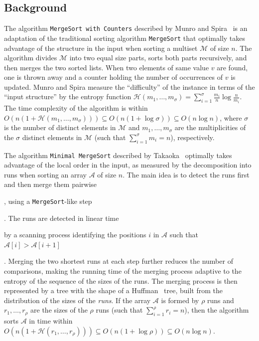\subsection{Background}
\label{sec:back}

The algorithm \texttt{MergeSort with Counters} described by Munro and
Spira~\cite{1976-JComp-SortingAndSearchingInMultisets-MunroSpira} is
an adaptation of the traditional sorting algorithm \texttt{MergeSort}
that optimally takes advantage of the structure in the input when
sorting a multiset $\mathcal{M}$ of size $n$. The algorithm divides
$\mathcal{M}$ into two equal size parts, sorts both parts recursively,
and then merges the two sorted lists. When two elements of same value $v$ are
found, one is thrown away and a counter holding the number of occurrences
of $v$ is updated. Munro and Spira measure the
``difficulty'' of the instance in terms of the ``input structure'' by
the entropy function
$\mathcal{H}(m_1, \dots, m_\sigma) =
\sum_{i=1}^\sigma{\frac{m_i}{n}}\log{\frac{n}{m_i}}$.  The time
complexity of the algorithm is within
$O(n(1 + \mathcal{H}(m_1, \dots, m_\sigma))) \subseteq
O(n(1{+}\log{\sigma})) \subseteq O(n\log{n})$, where $\sigma$ is the
number of distinct elements in $\mathcal{M}$ and
$m_1, \dots, m_\sigma$ are the multiplicities of the $\sigma$ distinct
elements in $\mathcal{M}$ (such that $\sum_{i=1}^\sigma {m_i}=n$),
respectively.

The algorithm \texttt{Minimal MergeSort} described by
Takaoka~\cite{2009-Chapter-PartialSolutionAndEntropy-Takaoka}
optimally takes advantage of the local order in the input, as measured
by the decomposition into runs when sorting an array $\mathcal{A}$ of
size $n$.  The main idea is to detect the runs first and then merge
them pairwise\begin{LONG}, using a \texttt{MergeSort}-like
  step\end{LONG}. The runs are detected in linear time\begin{LONG} by
  a scanning process identifying the positions $i$ in $\mathcal{A}$
  such that $\mathcal{A}[i] > \mathcal{A}[i+1]$\end{LONG}. Merging the
two shortest runs at each step further reduces the number of
comparisons, making the running time of the merging process adaptive
to the entropy of the sequence of the sizes of the runs.  The merging
process is then represented by a tree with the shape of a
Huffman~\cite{1952-IRE-AMethodForTheInstructionOfMinimumRedundancyCodes-Huffman}
tree, built from the distribution of the sizes of the \emph{runs}.  If
the array $\mathcal{A}$ is formed by $\rho$ runs and
$r_1, \dots, r_{\rho}$ are the sizes of the $\rho$ runs (such that
$\sum_{i=1}^\rho {r_i}=n$), then the algorithm sorts $\mathcal{A}$ in
time within
$O(n(1+\mathcal{H}(r_1, \dots, r_{\rho}))) \subseteq
O(n(1{+}\log{\rho})) \subseteq O(n\log{n})$.

